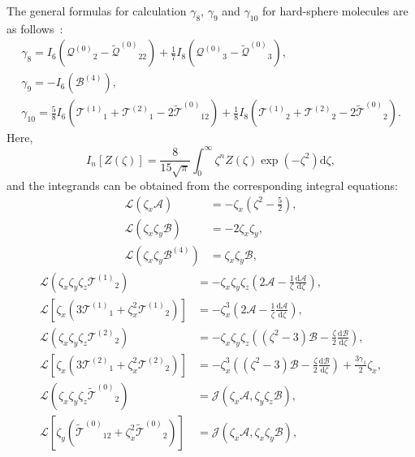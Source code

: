 \documentclass[aip,pof,preprint]{revtex4-1}
\newcommand{\dd}{\mathrm{d}}
\newcommand{\der}[2][]{\frac{\dd#1}{\dd#2}}
\newcommand{\B}{\ensuremath{\mathcal{B}^{(4)}}}
\newcommand{\Q}{\ensuremath{\mathcal{Q}^{(0)}}}
\newcommand{\T}[1]{\ensuremath{\mathcal{T}^{(#1)}}}
\newcommand{\TT}{\ensuremath{\tilde{\mathcal{T}}^{(0)}}}
\newcommand{\QQ}{\ensuremath{\tilde{\mathcal{Q}}^{(0)}}}
\begin{document}
The general formulas for calculation \(\gamma_8\), \(\gamma_9\) and \(\gamma_{10}\)
for hard-sphere molecules are as follows~\cite{Sone2000, Sone2002, Sone2007}:
\begin{gather}
    \gamma_8 = I_6\left(\Q_2 - \QQ_{22}\right) + \frac17 I_8\left(\Q_3 - \QQ_3\right), \label{eq:gamma_8}\\
    \gamma_9 = -I_6\left(\B\right), \label{eq:gamma_9}\\
    \gamma_{10} = \frac58 I_6\left(\T{1}_1 + \T{2}_1 - 2\TT_{12}\right)
        + \frac18 I_8\left(\T{1}_2 + \T{2}_2 - 2\TT_2\right). \label{eq:gamma_10}
\end{gather}
Here,
\begin{equation}\label{eq:I_n}
    I_n[Z(\zeta)] = \frac{8}{15\sqrt\pi} \int_0^\infty \zeta^n Z(\zeta) \exp(-\zeta^2) \dd\zeta,
\end{equation}
and the integrands can be obtained from the corresponding integral equations:
\begin{align}
    \mathcal{L}\left(\zeta_x\mathcal{A}\right) &= -\zeta_x\left(\zeta^2-\frac52\right), \label{eq:A}\\
    \mathcal{L}\left(\zeta_x\zeta_y\mathcal{B}\right) &= -2\zeta_x\zeta_y, \label{eq:B}\\
    \mathcal{L}\left(\zeta_x\zeta_y\B\right) &= \zeta_x\zeta_y\mathcal{B}, \label{eq:B_4}
\end{align}
\begin{align}
    \mathcal{L}\left( \zeta_x\zeta_y\zeta_z\T{1}_2 \right)
        &= -\zeta_x\zeta_y\zeta_z\left(2\mathcal{A} - \frac1\zeta\der[\mathcal{A}]{\zeta}\right), \label{eq:T2a}\\
    \mathcal{L}\left[ \zeta_x\left(3\T{1}_1 + \zeta_x^2\T{1}_2\right) \right]
        &= -\zeta_x^3\left(2\mathcal{A} - \frac1\zeta\der[\mathcal{A}]{\zeta}\right), \label{eq:T1a}\\
    \mathcal{L}\left( \zeta_x\zeta_y\zeta_z\T{2}_2 \right)
        &= -\zeta_x\zeta_y\zeta_z\left((\zeta^2-3)\mathcal{B} - \frac\zeta2\der[\mathcal{B}]{\zeta}\right), \label{eq:T2b}\\
    \mathcal{L}\left[ \zeta_x\left(3\T{2}_1 + \zeta_x^2\T{2}_2\right) \right]
        &= -\zeta_x^3\left((\zeta^2-3)\mathcal{B} - \frac\zeta2\der[\mathcal{B}]{\zeta}\right) + \frac{3\gamma_1}{2}\zeta_x, \label{eq:T1b}\\
    \mathcal{L}\left( \zeta_x\zeta_y\zeta_z\TT_2 \right)
        &= \mathcal{J}\left( \zeta_x\mathcal{A}, \zeta_y\zeta_z\mathcal{B} \right), \label{eq:TT2}\\
    \mathcal{L}\left[ \zeta_y\left(\TT_{12} + \zeta_x^2\TT_2\right) \right]
        &= \mathcal{J}\left( \zeta_x\mathcal{A}, \zeta_x\zeta_y\mathcal{B} \right), \label{eq:TT12}
\end{align}
\end{document}
